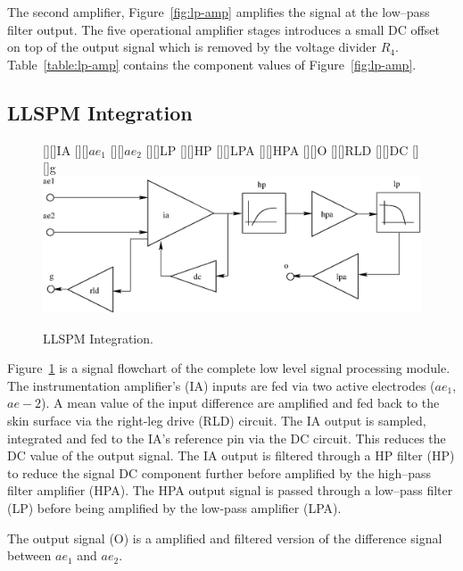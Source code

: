 The second amplifier, Figure~\ref{fig:lp-amp} amplifies the signal at
the low--pass filter output. The five operational amplifier stages
introduces a small DC offset on top of the output signal which is
removed by the voltage divider $R_4$. Table~\ref{table:lp-amp}
contains the component values of Figure~\ref{fig:lp-amp}.

\subsection{LLSPM Integration}
\begin{figure}[htbp]
\begin{center}
	[][]{IA}  
	[][]{$ae_{1}$}  
	[][]{$ae_{2}$}  
	[][]{LP}  
	[][]{HP}
	[][]{LPA}
	[][]{HPA}
	[][]{O}       
	[][]{RLD}  
	[][]{DC}  
	[][]{g}  
	\includegraphics[width=\textwidth]{llspm-int.eps}
	\caption{LLSPM Integration.}
\label{fig:llspm-int}
\end{center}
\end{figure}

Figure~\ref{fig:llspm-int} is a signal flowchart of the complete low
level signal processing module. The instrumentation amplifier's (IA)
inputs are fed via two active electrodes ($ae_{1}$, $ae-{2}$). A mean
value of the input difference are amplified and fed back to the skin
surface via the right-leg drive (RLD) circuit. The IA output is
sampled, integrated and fed to the IA's reference pin via the DC
circuit. This reduces the DC value of the output signal. The IA output
is filtered through a HP filter (HP) to reduce the signal DC component
further before amplified by the high--pass filter amplifier (HPA). The
HPA output signal is passed through a low--pass filter (LP) before
being amplified by the low-pass amplifier (LPA).

The output signal (O) is a amplified and filtered version of the
difference signal between $ae_{1}$ and $ae_{2}$.


